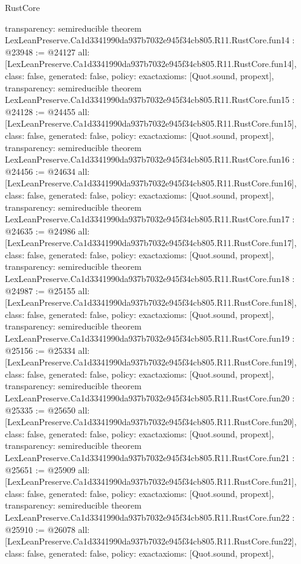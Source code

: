 \begin{lexlean}{RustCore}
\begin{coremodule}
{  transparency: semireducible
}
theorem LexLeanPreserve.Ca1d3341990da937b7032e945f34cb805.R11.RustCore.fun14 : @23948 := @24127 {
  all: [LexLeanPreserve.Ca1d3341990da937b7032e945f34cb805.R11.RustCore.fun14],
  class: false,
  generated: false,
  policy: exact{axioms: [Quot.sound, propext]},
  transparency: semireducible
}
theorem LexLeanPreserve.Ca1d3341990da937b7032e945f34cb805.R11.RustCore.fun15 : @24128 := @24455 {
  all: [LexLeanPreserve.Ca1d3341990da937b7032e945f34cb805.R11.RustCore.fun15],
  class: false,
  generated: false,
  policy: exact{axioms: [Quot.sound, propext]},
  transparency: semireducible
}
theorem LexLeanPreserve.Ca1d3341990da937b7032e945f34cb805.R11.RustCore.fun16 : @24456 := @24634 {
  all: [LexLeanPreserve.Ca1d3341990da937b7032e945f34cb805.R11.RustCore.fun16],
  class: false,
  generated: false,
  policy: exact{axioms: [Quot.sound, propext]},
  transparency: semireducible
}
theorem LexLeanPreserve.Ca1d3341990da937b7032e945f34cb805.R11.RustCore.fun17 : @24635 := @24986 {
  all: [LexLeanPreserve.Ca1d3341990da937b7032e945f34cb805.R11.RustCore.fun17],
  class: false,
  generated: false,
  policy: exact{axioms: [Quot.sound, propext]},
  transparency: semireducible
}
theorem LexLeanPreserve.Ca1d3341990da937b7032e945f34cb805.R11.RustCore.fun18 : @24987 := @25155 {
  all: [LexLeanPreserve.Ca1d3341990da937b7032e945f34cb805.R11.RustCore.fun18],
  class: false,
  generated: false,
  policy: exact{axioms: [Quot.sound, propext]},
  transparency: semireducible
}
theorem LexLeanPreserve.Ca1d3341990da937b7032e945f34cb805.R11.RustCore.fun19 : @25156 := @25334 {
  all: [LexLeanPreserve.Ca1d3341990da937b7032e945f34cb805.R11.RustCore.fun19],
  class: false,
  generated: false,
  policy: exact{axioms: [Quot.sound, propext]},
  transparency: semireducible
}
theorem LexLeanPreserve.Ca1d3341990da937b7032e945f34cb805.R11.RustCore.fun20 : @25335 := @25650 {
  all: [LexLeanPreserve.Ca1d3341990da937b7032e945f34cb805.R11.RustCore.fun20],
  class: false,
  generated: false,
  policy: exact{axioms: [Quot.sound, propext]},
  transparency: semireducible
}
theorem LexLeanPreserve.Ca1d3341990da937b7032e945f34cb805.R11.RustCore.fun21 : @25651 := @25909 {
  all: [LexLeanPreserve.Ca1d3341990da937b7032e945f34cb805.R11.RustCore.fun21],
  class: false,
  generated: false,
  policy: exact{axioms: [Quot.sound, propext]},
  transparency: semireducible
}
theorem LexLeanPreserve.Ca1d3341990da937b7032e945f34cb805.R11.RustCore.fun22 : @25910 := @26078 {
  all: [LexLeanPreserve.Ca1d3341990da937b7032e945f34cb805.R11.RustCore.fun22],
  class: false,
  generated: false,
  policy: exact{axioms: [Quot.sound, propext]},
}
\end{coremodule}
\end{lexlean}
